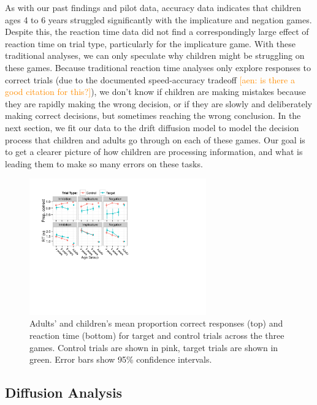 \documentclass[10pt,letterpaper]{article}
\newcommand{\aen}[1]{\textcolor{DarkOrange}{[aen: #1]}}
\begin{document}
As with our past findings \cite{yoonchildren, nordmeyer2014b} and pilot data, accuracy data indicates that children ages 4 to 6 years struggled significantly with the implicature and negation games.  Despite this, the reaction time data did not find a correspondingly large effect of reaction time on trial type, particularly for the implicature game.  With these traditional analyses, we can only speculate why children might be struggling on these games.  Because traditional reaction time analyses only explore responses to correct trials (due to the documented speed-accuracy tradeoff \aen{is there a good citation for this?}), we don't know if children are making mistakes because they are rapidly making the wrong decision, or if they are slowly and deliberately making correct decisions, but sometimes reaching the wrong conclusion.  In the next section, we fit our data to the drift diffusion model \cite{ratcliff1978theory} to model the decision process that children and adults go through on each of these games.  Our goal is to get a clearer picture of how children are processing information, and what is leading them to make so many errors on these tasks. 


\begin{figure}
\begin{center} 
\includegraphics[width=3in]{figures/correct_RT.pdf}
\caption{\label{fig:traditional} Adults' and children's mean proportion correct responses (top) and reaction time (bottom) for target and control trials across the three games.  Control trials are shown in pink, target trials are shown in green.  Error bars show 95\% confidence intervals.  }
\end{center} 
\end{figure}

\subsection{Diffusion Analysis}
\end{document}
